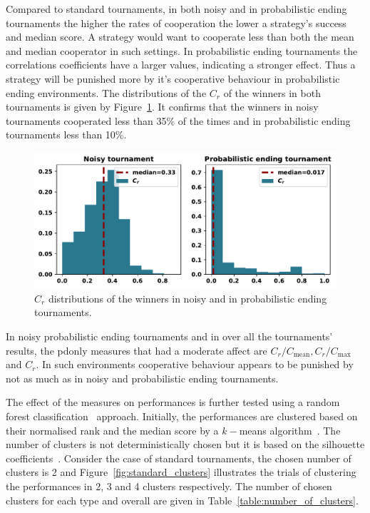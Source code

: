 \documentclass{article}
\begin{document}
Compared to standard tournaments, in both noisy and in probabilistic ending
tournaments the higher the rates of cooperation the lower a strategy's success
and median score. A strategy would want to cooperate less than both
the mean and median cooperator in such settings. In probabilistic ending
tournaments the correlations coefficients have a larger values, indicating a
stronger effect. Thus a strategy will be punished more by it's cooperative
behaviour in probabilistic ending environments. The distributions of the $C_r$ of the winners in
both tournaments is given by Figure~\ref{fig:c_r_distributions}. It confirms
that the winners in noisy tournaments cooperated less than 35\% of the times
and in probabilistic ending tournaments less than 10\%.

\begin{figure}[!htbp]
    \centering
    \includegraphics[width=.7\textwidth]{../images/c_r_winners_tournaments.pdf}
    \caption{$C_r$ distributions of the winners in noisy and in probabilistic
    ending tournaments.}\label{fig:c_r_distributions}
\end{figure}

In noisy probabilistic ending tournaments and in over all the tournaments' results,
the pdonly measures that had a moderate affect are $C_r/C_{\text{mean}},
C_r/C_{\text{max}}$ and $C_r$. In such environments cooperative behaviour
appears to be punished by not as much as in noisy and probabilistic ending
tournaments.

The effect of the measures on performances is further tested using a random forest
classification~\cite{breiman2001} approach. Initially, the performances are
clustered based on their normalised rank and the median score by a \(k-\)means
algorithm~\cite{Arthur2007}. The number of clusters is not deterministically
chosen but it is based on the silhouette coefficients~\cite{Rousseeuw1987}.
Consider the case of standard tournaments, the chosen number of clusters is
2 and Figure~\ref{fig:standard_clusters} illustrates the trials of clustering the
performances in 2, 3 and 4 clusters respectively. The number of chosen clusters
for each type and overall are given in Table~\ref{table:number_of_clusters}.
\end{document}
